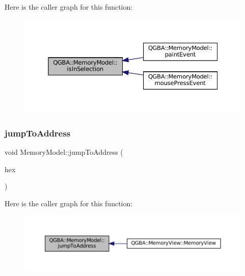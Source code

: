Here is the caller graph for this function\+:
\nopagebreak
\begin{figure}[H]
\begin{center}
\leavevmode
\includegraphics[width=350pt]{class_q_g_b_a_1_1_memory_model_a366e54f712353b0e3838decfd05e240c_icgraph}
\end{center}
\end{figure}
\mbox{\label{class_q_g_b_a_1_1_memory_model_a212c953c6a7e14a707bef9017982cea8}} 
\subsubsection{\texorpdfstring{jump\+To\+Address}{jumpToAddress}\hspace{0.1cm}{\footnotesize\ttfamily [1/2]}}
{\footnotesize\ttfamily void Memory\+Model\+::jump\+To\+Address (\begin{DoxyParamCaption}\item[{const Q\+String \&}]{hex }\end{DoxyParamCaption})\hspace{0.3cm}{\ttfamily [slot]}}

Here is the caller graph for this function\+:
\nopagebreak
\begin{figure}[H]
\begin{center}
\leavevmode
\includegraphics[width=350pt]{class_q_g_b_a_1_1_memory_model_a212c953c6a7e14a707bef9017982cea8_icgraph}
\end{center}
\end{figure}
\mbox{\label{class_q_g_b_a_1_1_memory_model_ad2400bd156a1b4b5f7f275a884ec0f67}} 
